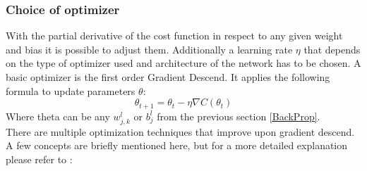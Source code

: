 			\subsubsection{Choice of optimizer}
				With the partial derivative of the cost function in respect to any given weight and bias it is possible to adjust them. Additionally a learning rate $\eta$ that depends on the type of optimizer used and architecture of the network has to be chosen. A basic optimizer is the first order Gradient Descend. It applies the following formula to update parameters $\theta$:
				\begin{equation}
					\theta_{t+1}=\theta_t - \eta \nabla C(\theta_t)
					\label{EQ:GD}
				\end{equation}
				Where theta can be any $w^l_{j,k}$ or $b^l_j$ from the previous section \ref{BackProp}.\\
				There are multiple optimization techniques that improve upon gradient descend. A few concepts are briefly mentioned here, but for a more detailed explanation please refer to \cite{NNOpti}:
